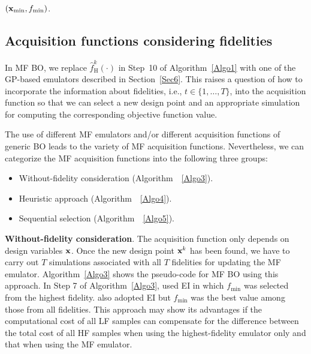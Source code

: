 \documentclass[iicol,sn-basic]{sn-jnl}%
\theoremstyle{thmstyleone}%
\theoremstyle{thmstyletwo}
\theoremstyle{thmstylethree}
\begin{document}
\begin{linenumbers}
\begin{algorithm}
\begin{algorithmic}[1]
		\State \Return $({\bf x}_{\min},f_{\min})$.
	\end{algorithmic}
\end{algorithm}

\subsection{Acquisition functions considering fidelities}\label{Sec62}

In MF BO, we replace $\hat{f}_\text{H}^k(\cdot)$ in Step~10 of Algorithm~\ref{Algo1} with one of the GP-based emulators described in Section~\ref{Sec6}.
This raises a question of how to incorporate the information about fidelities, i.e., $t \in \{1,\dots,T\}$, into the acquisition function so that we can select a new design point and an appropriate simulation for computing the corresponding objective function value. 
 
The use of different MF emulators and/or different acquisition functions of generic BO leads to the variety of MF acquisition functions. Nevertheless, we can categorize the MF acquisition functions into the following three groups: 
\begin{itemize}
	\item Without-fidelity consideration (Algorithm~~\ref{Algo3}).
	
	\item Heuristic approach (Algorithm~~\ref{Algo4}).
	
	\item Sequential selection (Algorithm~~\ref{Algo5}).
	 
\end{itemize}

\textbf{Without-fidelity consideration}.
The acquisition function only depends on design variables $\bf x$.
Once the new design point ${\bf x}^k$ has been found, we have to carry out $T$ simulations associated with all $T$ fidelities for updating the MF emulator.
Algorithm~\ref{Algo3} shows the pseudo-code for MF BO using this approach.
In Step 7 of Algorithm~\ref{Algo3}, \cite{Forrester2007} used EI in which $f_{\min}$ was selected from the highest fidelity. \cite{Perdikaris2016} also adopted EI but $f_{\min}$ was the best value among those from all fidelities.
This approach may show its advantages if the computational cost of all LF samples can compensate for the difference between the total cost of all HF samples when using the highest-fidelity emulator only and that when using the MF emulator.


\end{linenumbers}
\end{document}
